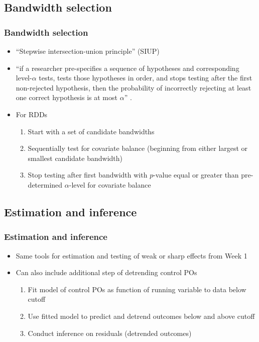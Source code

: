 \documentclass[table, xcolor = {dvipsnames}, 9pt]{beamer}
\theoremstyle{plain}
\begin{document}
\subsection{Bandwidth selection}
\begin{frame}
\frametitle{Bandwidth selection} 
\begin{itemize} \vfill
\item ``Stepwise intersection-union principle'' (SIUP) \\ \citep{hansensales2015,rosenbaum2008,berger1988} \vfill
\item[] ``if a researcher pre-specifies a sequence of hypotheses and corresponding level-$\alpha$ tests, tests those hypotheses in order, and stops testing after the first non-rejected hypothesis, then the probability of incorrectly rejecting at least one correct hypothesis is at most $\alpha$'' \citep[p. 185]{hansensales2015}. \vfill
\item For RDDs \vfill
\begin{enumerate} \vfill
\item Start with a set of candidate bandwidths \vfill
\item Sequentially test for covariate balance (beginning from either largest or smallest candidate bandwidth) \vfill
\item Stop testing after first bandwidth with $p$-value equal or greater than pre-determined $\alpha$-level for covariate balance \vfill
\end{enumerate} \vfill
\end{itemize} \vfill
\end{frame}
\subsection{Estimation and inference}
\begin{frame}
\frametitle{Estimation and inference} 
\vfill
\begin{itemize} \vfill
\item Same tools for estimation and testing of weak or sharp effects from Week 1 \vfill
\item Can also include additional step of detrending control POs \\ \citep{saleshansenrowan2018,saleshansen2020} \vfill
\begin{enumerate} \vfill
\item Fit model of control POs as function of running variable to data below cutoff \vfill
\item Use fitted model to predict and detrend outcomes below and above cutoff \vfill
\item Conduct inference on residuals (detrended outcomes) \vfill
\end{enumerate} \vfill
\end{itemize} \vfill
\end{frame}
\end{document}
